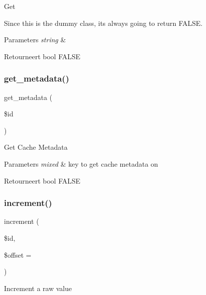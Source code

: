 Get

Since this is the dummy class, it\textquotesingle{}s always going to return F\+A\+L\+SE.


\begin{DoxyParams}{Parameters}
{\em string} & \\
\hline
\end{DoxyParams}
\begin{DoxyReturn}{Retourneert}
bool F\+A\+L\+SE 
\end{DoxyReturn}
\mbox{\label{class_c_i___cache__dummy_a59635cf18e997c5141bffa05ff7622e0}} 
\subsubsection{\texorpdfstring{get\_metadata()}{get\_metadata()}}
{\footnotesize\ttfamily get\+\_\+metadata (\begin{DoxyParamCaption}\item[{}]{\$id }\end{DoxyParamCaption})}

Get Cache Metadata


\begin{DoxyParams}{Parameters}
{\em mixed} & key to get cache metadata on \\
\hline
\end{DoxyParams}
\begin{DoxyReturn}{Retourneert}
bool F\+A\+L\+SE 
\end{DoxyReturn}
\mbox{\label{class_c_i___cache__dummy_a2f07a4e09b57f4460d49852497d1808f}} 
\subsubsection{\texorpdfstring{increment()}{increment()}}
{\footnotesize\ttfamily increment (\begin{DoxyParamCaption}\item[{}]{\$id,  }\item[{}]{\$offset = {} }\end{DoxyParamCaption})}

Increment a raw value


